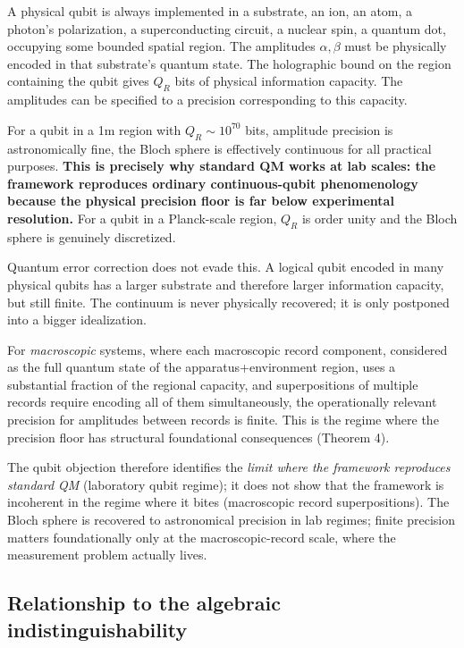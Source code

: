 \documentclass[11pt,a4paper]{article}
\begin{document}
A physical qubit is always implemented in a substrate, an ion, an atom, a photon's polarization, a superconducting circuit, a nuclear spin, a quantum dot, occupying some bounded spatial region. The amplitudes $\alpha, \beta$ must be physically encoded in that substrate's quantum state. The holographic bound on the region containing the qubit gives $Q_R$ bits of physical information capacity. The amplitudes can be specified to a precision corresponding to this capacity.

For a qubit in a 1m region with $Q_R \sim 10^{70}$ bits, amplitude precision is astronomically fine, the Bloch sphere is effectively continuous for all practical purposes. \textbf{This is precisely why standard QM works at lab scales: the framework reproduces ordinary continuous-qubit phenomenology because the physical precision floor is far below experimental resolution.} For a qubit in a Planck-scale region, $Q_R$ is order unity and the Bloch sphere is genuinely discretized.

Quantum error correction does not evade this. A logical qubit encoded in many physical qubits has a larger substrate and therefore larger information capacity, but still finite. The continuum is never physically recovered; it is only postponed into a bigger idealization.

For \emph{macroscopic} systems, where each macroscopic record component, considered as the full quantum state of the apparatus+environment region, uses a substantial fraction of the regional capacity, and superpositions of multiple records require encoding all of them simultaneously, the operationally relevant precision for amplitudes between records is finite. This is the regime where the precision floor has structural foundational consequences (Theorem 4).

The qubit objection therefore identifies the \emph{limit where the framework reproduces standard QM} (laboratory qubit regime); it does not show that the framework is incoherent in the regime where it bites (macroscopic record superpositions). The Bloch sphere is recovered to astronomical precision in lab regimes; finite precision matters foundationally only at the macroscopic-record scale, where the measurement problem actually lives.

\subsection{Relationship to the algebraic indistinguishability}
\end{document}

